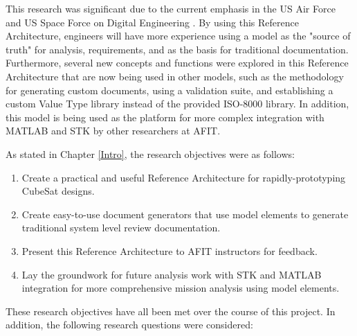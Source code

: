 This research was significant due to the current emphasis in the US Air Force and US Space Force on Digital Engineering \citep{Roper2019}. By using this Reference Architecture, engineers will have more experience using a model as the "source of truth" for analysis, requirements, and as the basis for traditional documentation. Furthermore, several new concepts and functions were explored in this Reference Architecture that are now being used in other models, such as the methodology for generating custom documents, using a validation suite, and establishing a custom Value Type library instead of the provided ISO-8000 library. In addition, this model is being used as the platform for more complex integration with MATLAB and STK by other researchers at AFIT.

\noindent As stated in Chapter \ref{Intro}, the research objectives were as follows:

\begin{enumerate}
\item{Create a practical and useful Reference Architecture for rapidly-prototyping CubeSat designs.}
\item{Create easy-to-use document generators that use model elements to generate traditional system level review documentation.}
\item{Present this Reference Architecture to AFIT instructors for feedback.}
\item{Lay the groundwork for future analysis work with STK and MATLAB integration for more comprehensive mission analysis using model elements.}
\end{enumerate}

These research objectives have all been met over the course of this project. In addition, the following research questions were considered:

